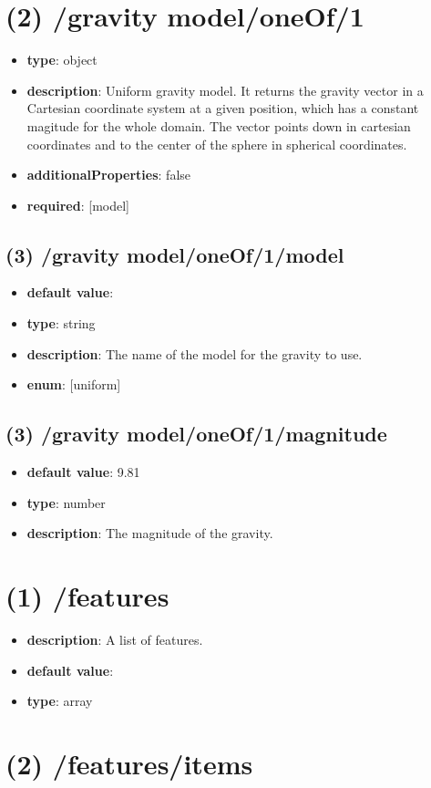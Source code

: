 \section{(2) /gravity model/oneOf/1}
\begin{itemize}[leftmargin=2em]\item {\bf type}: object
\item {\bf description}: Uniform gravity model. It returns the gravity vector in a Cartesian coordinate system at a given position, which has a constant magitude for the whole domain. The vector points down in cartesian coordinates and to the center of the sphere in spherical coordinates.
\item {\bf additionalProperties}: false
\item {\bf required}: [model]\end{itemize}
\subsection{(3) /gravity model/oneOf/1/model}
\begin{itemize}[leftmargin=3em]\item {\bf default value}: 
\item {\bf type}: string
\item {\bf description}: The name of the model for the gravity to use.
\item {\bf enum}: [uniform]\end{itemize}\subsection{(3) /gravity model/oneOf/1/magnitude}
\begin{itemize}[leftmargin=3em]\item {\bf default value}: 9.81
\item {\bf type}: number
\item {\bf description}: The magnitude of the gravity.
\end{itemize}\section{(1) /features}
\begin{itemize}[leftmargin=1em]\item {\bf description}: A list of features.
\item {\bf default value}: 
\item {\bf type}: array
\end{itemize}\section{(2) /features/items}

